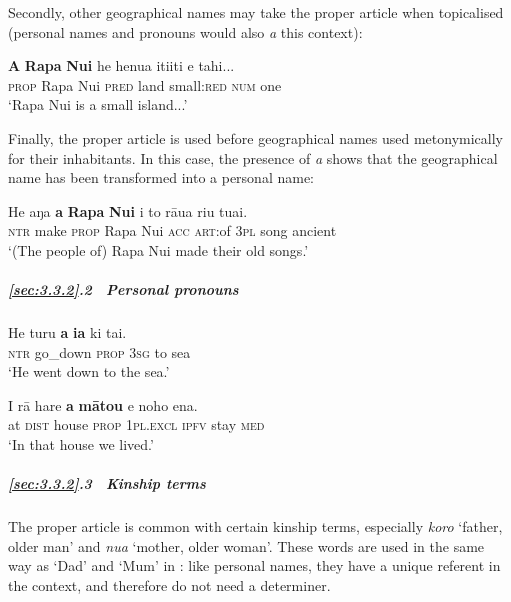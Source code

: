 Secondly, other geographical names may take the proper article when topicalised (personal names and pronouns would also \textit{a} this context):

\ea\label{ex:3.70}
\gll \textbf{A} \textbf{Rapa} \textbf{Nui} he henua {\ꞌ}iti{\ꞌ}iti e tahi... \\
\textsc{prop} Rapa Nui \textsc{pred} land small:\textsc{red} \textsc{num} one \\

\glt
‘Rapa Nui is a small island...’ \textstyleExampleref{[R351.001]}  
\z

Finally, the proper article is used before geographical names used metonymically for their inhabitants. In this case, the presence of \textit{a} shows that the geographical name has been transformed into a personal name:

\ea\label{ex:3.71}
\gll He aŋa \textbf{a} \textbf{Rapa} \textbf{Nui} i to rāua riu tuai. \\
\textsc{ntr} make \textsc{prop} Rapa Nui \textsc{acc} \textsc{art}:of \textsc{3pl} song ancient \\

\glt 
‘(The people of) Rapa Nui made their old songs.’ \textstyleExampleref{[R620.013]} 
\z

\subparagraph{\ref{sec:3.3.2}.2~ Personal pronouns}

\ea\label{ex:3.72}
\gll He turu \textbf{a} \textbf{ia} ki tai. \\
\textsc{ntr} go\_down \textsc{prop} \textsc{3sg} to sea \\

\glt 
‘He went down to the sea.’ \textstyleExampleref{[Notes]}
\z

\ea\label{ex:3.73}
\gll {\ꞌ}I rā hare \textbf{a} \textbf{mātou} e noho ena. \\
at \textsc{dist} house \textsc{prop} \textsc{1pl.excl} \textsc{ipfv} stay \textsc{med} \\

\glt 
‘In that house we lived.’ \textstyleExampleref{[R416.961]} 
\z

\subparagraph{\ref{sec:3.3.2}.3~ Kinship terms}The proper article is common with certain kinship terms, especially \textit{koro} ‘father, older man’ and \textit{nua} ‘mother, older woman’. These words are used in the same way as ‘Dad’ and ‘Mum’ in : like personal names, they have a unique referent in the context, and therefore do not need a determiner.

